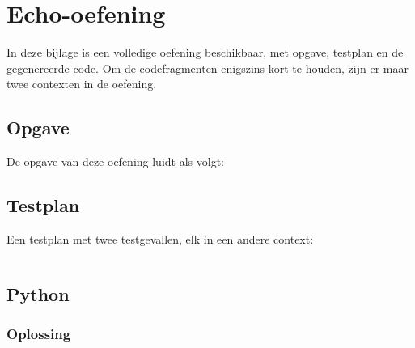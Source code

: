 \chapter{Echo-oefening}\label{ch:echo-oefening}

In deze bijlage is een volledige oefening beschikbaar, met opgave, testplan en de gegenereerde code.
Om de codefragmenten enigszins kort te houden, zijn er maar twee contexten in de oefening.

\section{Opgave}\label{sec:echo-opgave}

De opgave van deze oefening luidt als volgt:

\begin{quote}
\end{quote}

\section{Testplan}\label{sec:echo-testplan}

Een testplan met twee testgevallen, elk in een andere context:

\inputminted{json}{sources/echo/two.tson}

\section{Python}\label{sec:echo-python}

\subsection{Oplossing}\label{subsec:echo-python-oplossing}

